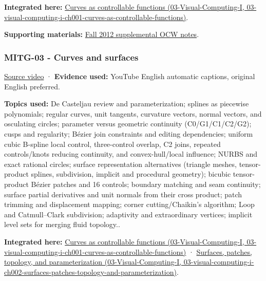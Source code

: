 \textbf{Integrated here:} \href{../03-Visual-Computing-I/main.pdf\#nameddest=03-visual-computing-i-ch001-curves-as-controllable-functions}{Curves as controllable functions (03-Visual-Computing-I, 03-visual-computing-i-ch001-curves-as-controllable-functions)}.

\textbf{Supporting materials:} \href{https://ocw.mit.edu/courses/6-837-computer-graphics-fall-2012/pages/lecture-notes/}{Fall 2012 supplemental OCW notes}.

\subsubsection{MITG-03 - Curves and surfaces}\label{04-visual-computing-ii-ch036-mitg-03---curves-and-surfaces}

\href{https://www.youtube.com/watch?v=LzIjSdNoR9s}{Source video} · \textbf{Evidence used:} YouTube English automatic captions, original English preferred.

\textbf{Topics used:} De Casteljau review and parameterization; splines as piecewise polynomials; regular curves, unit tangents, curvature vectors, normal vectors, and osculating circles; parameter versus geometric continuity (C0/G1/C1/C2/G2); cusps and regularity; Bézier join constraints and editing dependencies; uniform cubic B-spline local control, three-control overlap, C2 joins, repeated controls/knots reducing continuity, and convex-hull/local influence; NURBS and exact rational circles; surface representation alternatives (triangle meshes, tensor-product splines, subdivision, implicit and procedural geometry); bicubic tensor-product Bézier patches and 16 controls; boundary matching and seam continuity; surface partial derivatives and unit normals from their cross product; patch trimming and displacement mapping; corner cutting/Chaikin's algorithm; Loop and Catmull--Clark subdivision; adaptivity and extraordinary vertices; implicit level sets for merging fluid topology..

\textbf{Integrated here:} \href{../03-Visual-Computing-I/main.pdf\#nameddest=03-visual-computing-i-ch001-curves-as-controllable-functions}{Curves as controllable functions (03-Visual-Computing-I, 03-visual-computing-i-ch001-curves-as-controllable-functions)} · \href{../03-Visual-Computing-I/main.pdf\#nameddest=03-visual-computing-i-ch002-surfaces-patches-topology-and-parameterization}{Surfaces, patches, topology, and parameterization (03-Visual-Computing-I, 03-visual-computing-i-ch002-surfaces-patches-topology-and-parameterization)}.

